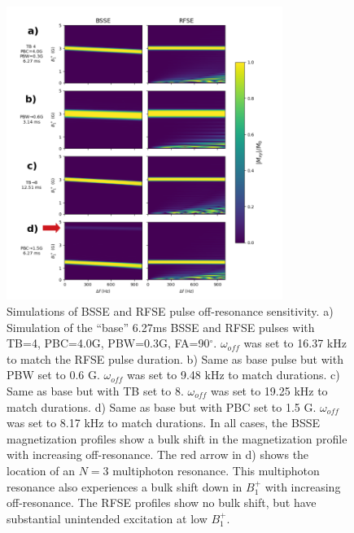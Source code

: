 \begin{figure}[h]
\centering
\includegraphics[width=0.8\textwidth]{figures/offres_processed.png}
\caption{Simulations of BSSE and RFSE pulse off-resonance sensitivity. 
a) Simulation of the ``base'' 6.27ms BSSE and RFSE pulses with TB=4, PBC=4.0G, PBW=0.3G, FA=90$^\circ$. 
$\omega_{off}$ was set to  16.37 kHz to match the RFSE pulse duration. 
b) Same as base pulse but with PBW set to 0.6 G. 
$\omega_{off}$ was set to 9.48 kHz to match durations. 
c) Same as base but with TB set to 8. 
$\omega_{off}$ was set to 19.25 kHz to match durations. 
d) Same as base but with PBC set to 1.5 G. 
$\omega_{off}$ was set to 8.17 kHz to match durations.
In all cases, the BSSE magnetization profiles show a bulk shift in the magnetization profile with increasing off-resonance. 
The red arrow in d) shows the location of an $N=3$ multiphoton resonance. 
This multiphoton resonance also experiences a bulk shift down in $B_1^+$ with increasing off-resonance. 
The RFSE profiles show no bulk shift, but have substantial unintended excitation at low $B_1^+$.}
\label{fig:offres}
\end{figure}

